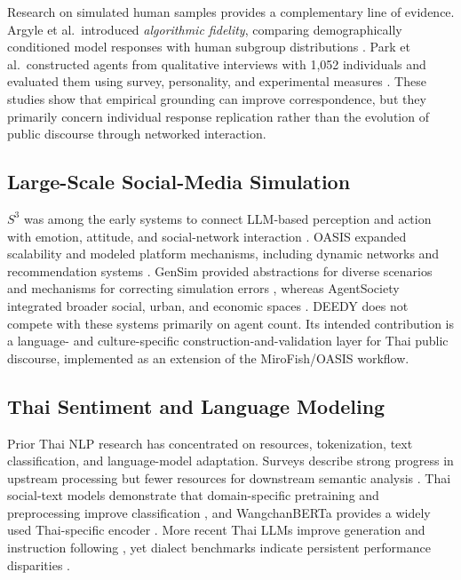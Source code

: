 \documentclass[10pt,twocolumn]{article}
\begin{document}
Research on simulated human samples provides a complementary line of evidence.
Argyle et al.\ introduced \emph{algorithmic fidelity}, comparing
demographically conditioned model responses with human subgroup distributions
\citep{argyle2023out}. Park et al.\ constructed agents from qualitative
interviews with 1,052 individuals and evaluated them using survey,
personality, and experimental measures \citep{park2024thousand}. These studies
show that empirical grounding can improve correspondence, but they primarily
concern individual response replication rather than the evolution of public
discourse through networked interaction.

\subsection{Large-Scale Social-Media Simulation}

$S^3$ was among the early systems to connect LLM-based perception and action
with emotion, attitude, and social-network interaction
\citep{gao2023s3}. OASIS expanded scalability and modeled platform mechanisms,
including dynamic networks and recommendation systems
\citep{yang2024oasis}. GenSim provided abstractions for diverse scenarios and
mechanisms for correcting simulation errors
\citep{tang2025gensim}, whereas AgentSociety integrated broader social, urban,
and economic spaces \citep{piao2025agentsociety}. DEEDY does not compete with
these systems primarily on agent count. Its intended contribution is a
language- and culture-specific construction-and-validation layer for Thai
public discourse, implemented as an extension of the MiroFish/OASIS workflow.

\subsection{Thai Sentiment and Language Modeling}

Prior Thai NLP research has concentrated on resources, tokenization, text
classification, and language-model adaptation. Surveys describe strong
progress in upstream processing but fewer resources for downstream semantic
analysis \citep{arreerard2022survey}. Thai social-text models demonstrate that
domain-specific pretraining and preprocessing improve classification
\citep{horsuwan2019socialtext}, and WangchanBERTa provides a widely used
Thai-specific encoder \citep{lowphansirikul2021wangchanberta}. More recent Thai
LLMs improve generation and instruction following
\citep{pipatanakul2023typhoon}, yet dialect benchmarks indicate persistent
performance disparities \citep{limkonchotiwat2025dialects}.
\end{document}
